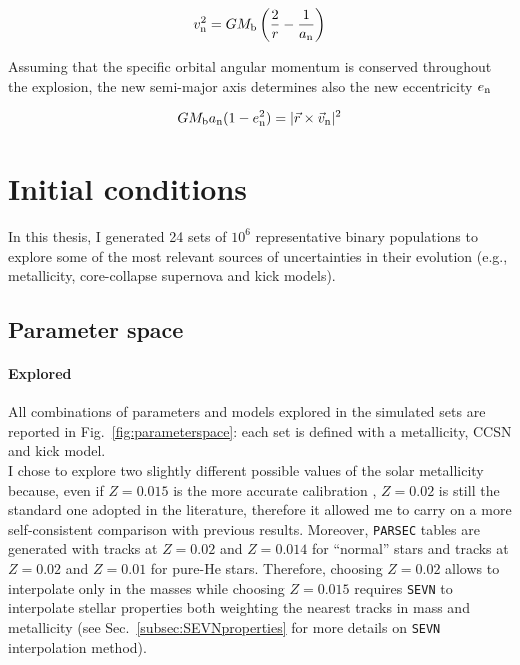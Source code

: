\documentclass[a4paper,titlepage]{book}     	%
\begin{document}
\begin{equation}\label{eq:neworbitalseparation}
    v_{\rm n}^2 = G M_{\rm b} \left( \frac{2}{r} - \frac{1}{a_{\rm n}} \right)
\end{equation}

Assuming that the specific orbital angular momentum is conserved throughout the explosion, the new semi-major axis determines also the new eccentricity $e_{\rm n}$ 

\begin{equation}\label{eq:neweccentricity}
    G M_{\rm b} a_{\rm n} (1-e_{\rm n}^2) = |\vec{r} \times \vec{v}_{\rm n}|^2
\end{equation}

\section{Initial conditions}\label{sec:initialconditionsSEVN}
In this thesis, I generated 24 sets of $10^6$ representative binary populations to explore some of the most relevant sources of uncertainties in their evolution (e.g., metallicity, core-collapse supernova and kick models). 

\subsection{Parameter space}\label{subsec:parameterspace}
\paragraph{Explored} All combinations of parameters and models explored in the simulated sets are reported in Fig.\ \ref{fig:parameterspace}: each set is defined with a metallicity, CCSN and kick model.\\

I chose to explore two slightly different possible values of the solar metallicity because, even if $Z=0.015$ is the more accurate calibration \cite{caffau2011solarmetallicity}, $Z=0.02$ is still the standard one adopted in the literature, therefore it allowed me to carry on a more self-consistent comparison with previous results. Moreover, \texttt{PARSEC} tables are generated with tracks at $Z=0.02$ and $Z=0.014$ for ``normal'' stars and tracks at $Z=0.02$ and $Z=0.01$ for pure-He stars. Therefore, choosing $Z=0.02$ allows to interpolate only in the masses while choosing $Z=0.015$ requires \texttt{SEVN} to interpolate stellar properties both weighting the nearest tracks in mass and metallicity (see Sec.\ \ref{subsec:SEVNproperties} for more details on \texttt{SEVN} interpolation method).\\
\end{document}
